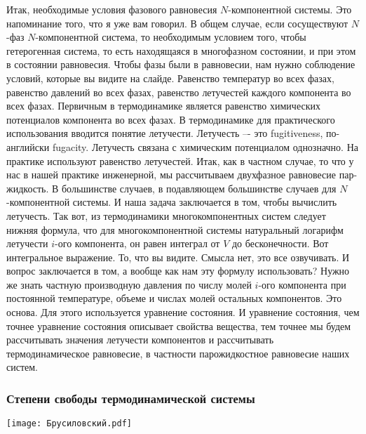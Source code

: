 \documentclass[main.tex]{subfiles}
\begin{document}
Итак, необходимые условия фазового равновесия $N$-компонентной системы.
Это напоминание того, что я уже вам говорил.
В общем случае, если сосуществуют $N$-фаз $N$-компонентной система, то необходимым условием того, чтобы гетерогенная система, то есть находящаяся в многофазном состоянии, и при этом в состоянии равновесия.
Чтобы фазы были в равновесии, нам нужно соблюдение условий, которые вы видите на слайде.
Равенство температур во всех фазах, равенство давлений во всех фазах, равенство летучестей каждого компонента во всех фазах.
Первичным в термодинамике является равенство химических потенциалов компонента во всех фазах.
В термодинамике для практического использования вводится понятие летучести.
Летучесть –- это fugitiveness, по-английски fugacity.
Летучесть связана с химическим потенциалом однозначно.
На практике используют равенство летучестей.
Итак, как в частном случае, то что у нас в нашей практике инженерной, мы рассчитываем двухфазное равновесие пар-жидкость.
В большинстве случаев, в подавляющем большинстве случаев для $N$-компонентной системы.
И наша задача заключается в том, чтобы вычислить летучесть.
Так вот, из термодинамики многокомпонентных систем следует нижняя формула, что для многокомпонентной системы натуральный логарифм летучести $i$-ого компонента, он равен интеграл от $V$ до бесконечности.
Вот интегральное выражение.
То, что вы видите.
Смысла нет, это все озвучивать.
И вопрос заключается в том, а вообще как нам эту формулу использовать?
Нужно же знать частную производную давления по числу молей $i$-ого компонента при постоянной температуре, объеме и числах молей остальных компонентов.
Это основа.
Для этого используется уравнение состояния.
И уравнение состояния, чем точнее уравнение состояния описывает свойства вещества, тем точнее мы будем рассчитывать значения летучести компонентов и рассчитывать термодинамическое равновесие, в частности парожидкостное равновесие наших систем.

\subsubsection{Степени свободы термодинамической системы}

\begin{center}
\texttt{[image: Брусиловский.pdf]}
\end{center}
\end{document}
